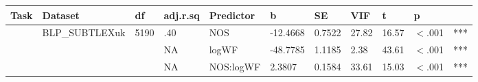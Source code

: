 \begin{table}[ht]
\centering
\begingroup\normalsize
\begin{tabular}{lllllllllll}
  \hline
Task & Dataset & df & adj.r.sq & Predictor & b & SE & VIF & t & p &  \\ 
  \hline
 & BLP\_SUBTLEXuk & 5190 & .40 & NOS & -12.4668 & 0.7522 & 27.82 & 16.57 & $<$.001 & *** \\ 
   &  &  & NA & logWF & -48.7785 & 1.1185 & 2.38 & 43.61 & $<$.001 & *** \\ 
   &  &  & NA & NOS:logWF & 2.3807 & 0.1584 & 33.61 & 15.03 & $<$.001 & *** \\ 
   \hline
\end{tabular}
\endgroup
\end{table}
